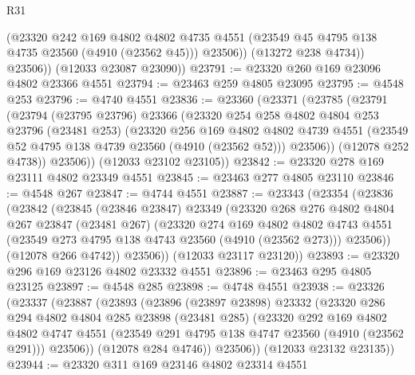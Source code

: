 \begin{lexlean}{R31}
\begin{coremodule}
              (@23320
                @242
                @169
                @4802
                @4802
                @4735
                @4551
                (@23549 @45 @4795 @138 @4735 @23560 (@4910 (@23562 @45)))
                @23506))
            (@13272 @238 @4734))
          @23506))
      (@12033 @23087 @23090))
@23791 := @23320 @260 @169 @23096 @4802 @23366 @4551
@23794 := @23463 @259 @4805 @23095
@23795 := @4548 @253
@23796 := @4740 @4551
@23836 := @23360
    (@23371
      (@23785
        (@23791
          (@23794
            (@23795 @23796)
            @23366
            (@23320
              @254
              @258
              @4802
              @4804
              @253
              @23796
              (@23481 @253)
              (@23320
                @256
                @169
                @4802
                @4802
                @4739
                @4551
                (@23549 @52 @4795 @138 @4739 @23560 (@4910 (@23562 @52)))
                @23506))
            (@12078 @252 @4738))
          @23506))
      (@12033 @23102 @23105))
@23842 := @23320 @278 @169 @23111 @4802 @23349 @4551
@23845 := @23463 @277 @4805 @23110
@23846 := @4548 @267
@23847 := @4744 @4551
@23887 := @23343
    (@23354
      (@23836
        (@23842
          (@23845
            (@23846 @23847)
            @23349
            (@23320
              @268
              @276
              @4802
              @4804
              @267
              @23847
              (@23481 @267)
              (@23320
                @274
                @169
                @4802
                @4802
                @4743
                @4551
                (@23549 @273 @4795 @138 @4743 @23560 (@4910 (@23562 @273)))
                @23506))
            (@12078 @266 @4742))
          @23506))
      (@12033 @23117 @23120))
@23893 := @23320 @296 @169 @23126 @4802 @23332 @4551
@23896 := @23463 @295 @4805 @23125
@23897 := @4548 @285
@23898 := @4748 @4551
@23938 := @23326
    (@23337
      (@23887
        (@23893
          (@23896
            (@23897 @23898)
            @23332
            (@23320
              @286
              @294
              @4802
              @4804
              @285
              @23898
              (@23481 @285)
              (@23320
                @292
                @169
                @4802
                @4802
                @4747
                @4551
                (@23549 @291 @4795 @138 @4747 @23560 (@4910 (@23562 @291)))
                @23506))
            (@12078 @284 @4746))
          @23506))
      (@12033 @23132 @23135))
@23944 := @23320 @311 @169 @23146 @4802 @23314 @4551

\end{coremodule}
\end{lexlean}
